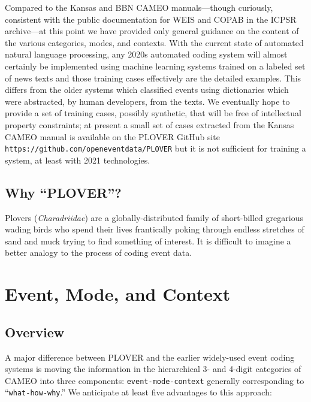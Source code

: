 \documentclass[11pt]{report}
\newcommand{\txt}[1]{\texttt{#1}}
\begin{document}
Compared to the Kansas and BBN CAMEO manuals---though curiously, consistent with the public documentation for WEIS and COPAB in the ICPSR archive---at this point we have provided only general guidance on the content of the various categories, modes, and contexts. With the current state of automated natural language processing, any 2020s automated coding system will almost certainly be implemented using machine learning systems trained on a labeled set of news texts and those training cases effectively are the detailed examples. This differs from the older systems which classified events using dictionaries which were abstracted, by human developers, from the texts. We eventually hope to provide a set of training cases, possibly synthetic, that will be free of intellectual property constraints; at present a small set of cases extracted from the Kansas CAMEO manual is available on the PLOVER GitHub site \txt{https://github.com/openeventdata/PLOVER} but it is not sufficient for training a system, at least with 2021 technologies.


\section{Why ``PLOVER''?}

Plovers (\textit{Charadriidae}) are a globally-distributed family of short-billed gregarious wading birds who spend their lives frantically poking through endless stretches of sand and muck trying to find something of interest. It is difficult to imagine a better analogy to the process of coding event data.


\chapter{Event, Mode, and Context}

\section{Overview}\label{ssec:ecm}

A major difference between PLOVER and the earlier widely-used event coding systems is moving the information in the hierarchical 3- and 4-digit categories of CAMEO into three components: \txt{event-mode-context} generally corresponding to ``\texttt{what-how-why}.'' We anticipate at least five advantages to this approach:
\end{document}
